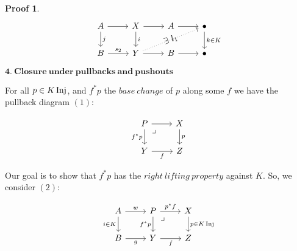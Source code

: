 \documentclass[a4paper]{article}
\theoremstyle{plain}
\theoremstyle{definition}
\newtheorem*{prf}{Proof}
\theoremstyle{remark}
\newcommand{\mbf}[1]{\mathbf{#1}}
\newcommand{\E}{\exists}
\DeclareMathOperator{\Inj}{\rm{Inj}}
\begin{document}
\begin{prf}
            \[\begin{tikzcd}
                A & X & A & \bullet \\
                B & Y & B & \bullet
                \arrow["{k\in K}", from=1-4, to=2-4]
                \arrow[from=1-3, to=1-4]
                \arrow[from=2-3, to=2-4]
                \arrow[from=1-2, to=1-3]
                \arrow[from=2-2, to=2-3]
                \arrow["i", from=1-2, to=2-2]
                \arrow[from=1-1, to=1-2]
                \arrow["j", from=1-1, to=2-1]
                \arrow["{s_2}", from=2-1, to=2-2]
                \arrow["{\E\ l_1}"{marking}, dotted, from=2-2, to=1-4]
            \end{tikzcd}\]

        \par $\mbf{4.\ Closure\ under\ pullbacks\ and\ pushouts}$\\

            \par For all $p \in K \Inj$, and $f^* p$ the $base\ change$ of $p$ along some $f$
            we have the pullback diagram $(1)$:

            \[\begin{tikzcd}
                P & X \\
                Y & Z
                \arrow["f"', from=2-1, to=2-2]
                \arrow["p", from=1-2, to=2-2]
                \arrow["{f^*p}"', from=1-1, to=2-1]
                \arrow[from=1-1, to=1-2]
                \arrow["{\big \lrcorner}"{anchor=center, pos=0.125}, draw=none, from=1-1, to=2-2]
            \end{tikzcd}\]

            \par Our goal is to show that $f^* p$ has the $right\ lifting\ property$ against $K$.
            So, we consider $(2)$:

            \[\begin{tikzcd}
                A & P & X \\
                B & Y & Z
                \arrow["f"', from=2-2, to=2-3]
                \arrow["{p \in K \Inj}", from=1-3, to=2-3]
                \arrow["{f^*p}"', from=1-2, to=2-2]
                \arrow["p^*f", from=1-2, to=1-3]
                \arrow["{\big \lrcorner}"{anchor=center, pos=0.125}, draw=none, from=1-2, to=2-3]
                \arrow["g"',from=2-1, to=2-2]
                \arrow["w", from=1-1, to=1-2]
                \arrow["{{i \in K}}"', from=1-1, to=2-1]
            \end{tikzcd}\]


\end{prf}
\end{document}
